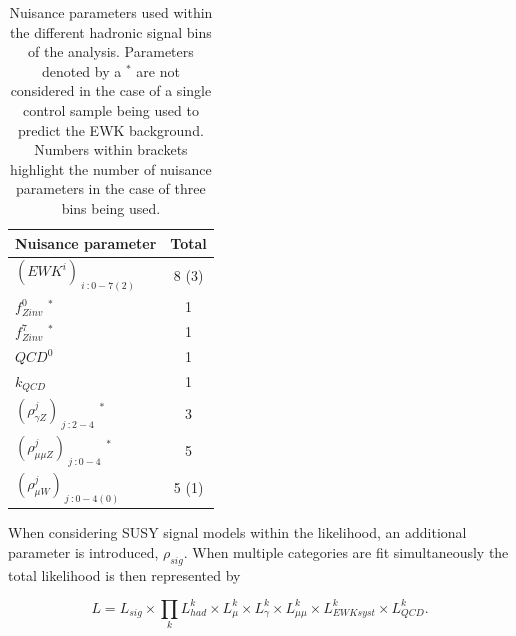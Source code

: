  \begin{table}[h!]
 \footnotesize
\begin{center}
\begin{tabular*}{0.45\textwidth}{@{\extracolsep{\fill}}lc}
\hline
Nuisance parameter & Total \\
\hline\hline
$(EWK^{i})_{\ i\ : 0-7(2)}$ & 8 (3) \\
$f^{0}_{Zinv}$ $^{*}$ & 1 \\
 $f^{7}_{Zinv}$ $^{*}$ & 1 \\
 $QCD^{0}$ & 1 \\
 $k_{QCD}$ & 1 \\
 $(\rho^{j}_{\gamma Z})_{\ j \ : 2-4}$ $^{*}$ & 3 \\
 $(\rho^{j}_{\mu\mu Z})_{\ j \ : 0-4}$  $^{*}$ & 5 \\
 $(\rho^{j}_{\mu W})_{\ j \ : 0-4(0)}$ & 5 (1) \\
\end{tabular*}
\end{center}
\caption[Nuisance parameters used within the different hadronic signal bins of the analysis]{Nuisance parameters used within the different hadronic signal bins of the analysis. Parameters denoted by a $^{*}$ are not considered in the case of a single control sample being used to predict the \ac{EWK} background. Numbers within brackets highlight the number of nuisance parameters in the case of three \theht bins being used.}\label{tab:nuisanceparameters}
\end{table}

When considering \ac{SUSY} signal models within the likelihood, an additional parameter is introduced, $\rho_{sig}$. When multiple categories are fit simultaneously the total likelihood is then represented by 

\begin{equation}
L =  L_{sig} \times \prod_{k} L^{k}_{had} \times  L^{k}_{\mu} \times  L^{k}_{\gamma} \times  L^{k}_{\mu\mu} \times  L^{k}_{EWK syst} \times  L^{k}_{QCD}.
\end{equation}